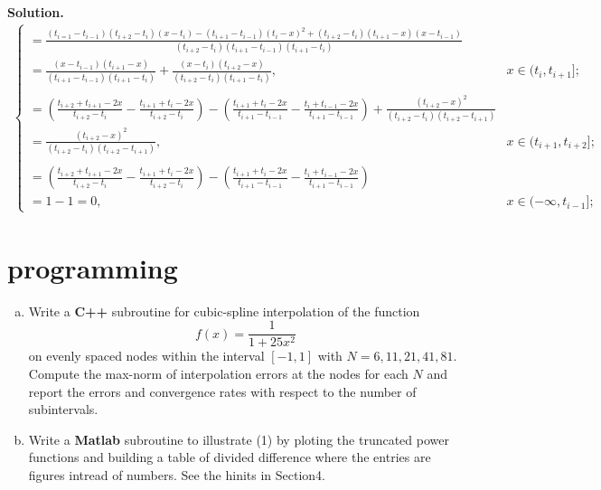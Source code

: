 \documentclass[a4paper]{book}
\newenvironment{solution}%
{\noindent\textbf{Solution.}}%
{\qedhere}
\numberwithin{equation}{chapter}
\theoremstyle{definition}
\begin{document}
\begin{solution}
\begin{align*}
\begin{cases}
        = \frac{(t_{i=1} - t_{i-1})(t_{i+2} - t_{i})(x - t_{i}) - (t_{i+1} - t_{i-1})(t_i -x)^2 + (t_{i+2} - t_{i})(t_{i+1} - x)(x-t_{i-1})}{(t_{i+2} - t_{i})(t_{i+1} - t_{i-1})(t_{i+1} - t_i)} \\
        = \frac{(x - t_{i-1})(t_{i+1} - x)}{(t_{i+1} - t_{i-1})(t_{i+1} - t_i)} + \frac{(x - t_{i})(t_{i+2} - x)}{(t_{i+2} - t_{i})(t_{i+1} - t_i)}, \qquad &x \in (t_{i},t_{i+1}]; \\ \\
        = (\frac{t_{i+2} + t_{i+1} - 2x}{t_{i+2} - t_{i}} - \frac{t_{i+1} + t_{i} - 2x}{t_{i+2} - t_{i}}) - (\frac{t_{i+1} + t_{i} - 2x}{t_{i+1} - t_{i-1}} - \frac{t_{i} + t_{i-1} - 2x}{t_{i+1} - t_{i-1}}) +  \frac{(t_{i+2} - x)^2}{(t_{i+2} - t_{i})(t_{i+2} - t_{i+1})} \\
        =  \frac{(t_{i+2} - x)^2}{(t_{i+2} - t_{i})(t_{i+2} - t_{i+1})}, \qquad &x \in (t_{i+1},t_{i+2}]; \\ \\
        = (\frac{t_{i+2} + t_{i+1} - 2x}{t_{i+2} - t_{i}} - \frac{t_{i+1} + t_{i} - 2x}{t_{i+2} - t_{i}}) - (\frac{t_{i+1} + t_{i} - 2x}{t_{i+1} - t_{i-1}} - \frac{t_{i} + t_{i-1} - 2x}{t_{i+1} - t_{i-1}}) \\
        = 1 - 1 = 0 , \qquad &x \in (-\infty,t_{i-1}];
      \end{cases}
  \end{align*}
\end{solution}

\section{programming}\label{sec:2}

\begin{enumerate}[(a)]
\item Write a \textbf{C++} subroutine for cubic-spline interpolation of the function
  \[f(x) = \frac{1}{1 + 25x^2}\]
  on evenly spaced nodes within the interval $[-1,1]$ with $N = 6,11,21,41,81$. Compute the max-norm of interpolation errors at the nodes for each $N$ and report the errors and convergence rates with respect to the number of subintervals.
\item Write a \textbf{Matlab} subroutine to illustrate (1) by ploting the truncated power functions and building a table of divided difference where the entries are figures intread of numbers. See the hinits in Section4.
\end{enumerate}
\end{document}
